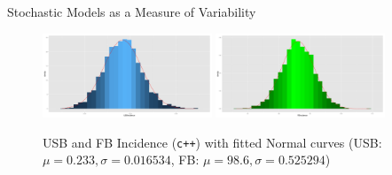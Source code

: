 \documentclass[final]{beamer}
\begin{document}
\begin{frame}
\begin{columns}[T]
\begin{column}{.3\textwidth}
      \begin{block}{Stochastic Models as a Measure of Variability}
        \begin{figure}[h]
          \begin{center}
            \includegraphics[width=0.45\textwidth]{IN0dist}
            \hspace{0.8em}
            \includegraphics[width=0.45\textwidth]{IN1dist}
          \end{center}
          \caption{USB and FB Incidence (\texttt{c++}) with fitted Normal curves (USB: $\mu = 0.233, \sigma = 0.016534$, FB: $\mu = 98.6, \sigma = 0.525294$)}
          \label{fig:INdist}
        \end{figure}
      \end{block}
      

\end{column}
\end{columns}
\end{frame}
\end{document}
